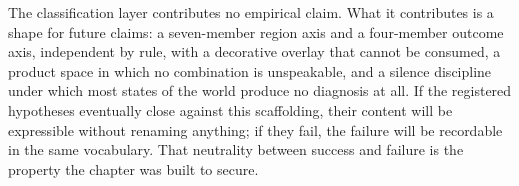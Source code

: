 \begin{remark}\label{ch07:rem:close}
The classification layer contributes no empirical claim. What it
contributes is a shape for future claims: a seven-member region axis and a
four-member outcome axis, independent by rule, with a decorative overlay
that cannot be consumed, a product space in which no combination is
unspeakable, and a silence discipline under which most states of the world
produce no diagnosis at all. If the registered hypotheses eventually close
against this scaffolding, their content will be expressible without
renaming anything; if they fail, the failure will be recordable in the same
vocabulary. That neutrality between success and failure is the property the
chapter was built to secure.
\end{remark}
